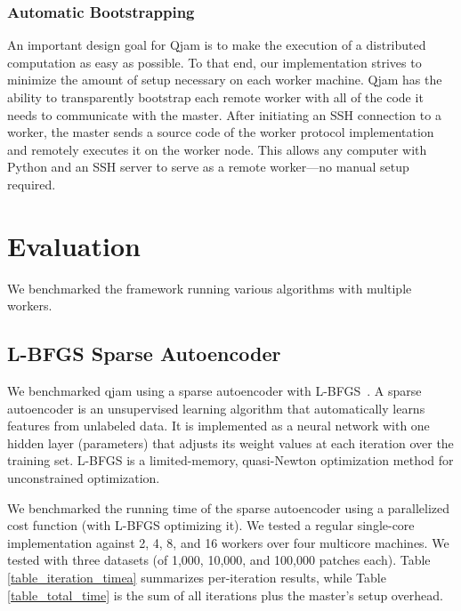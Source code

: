 \documentclass[%
  final,
  notitlepage,
  narroweqnarray,
  inline,
]{ieee}
\begin{document}
\subsubsection{Automatic Bootstrapping}
An important design goal for Qjam is to make the execution of a distributed
computation as easy as possible. To that end, our implementation strives to
minimize the amount of setup necessary on each worker machine. Qjam has the
ability to transparently bootstrap each remote worker with all of the code it
needs to communicate with the master. After initiating an SSH connection to a
worker, the master sends a source code of the worker protocol implementation and
remotely executes it on the worker node. This allows any computer with Python
and an SSH server to serve as a remote worker---no manual setup required.


\section{Evaluation}

We benchmarked the framework running various algorithms with multiple workers.

\subsection{L-BFGS Sparse Autoencoder}

We benchmarked qjam using a sparse autoencoder with L-BFGS~\cite{lbfgs}. A
sparse autoencoder is an unsupervised learning algorithm that automatically
learns features from unlabeled data. It is implemented as a neural network with
one hidden layer (parameters) that adjusts its weight values at each iteration
over the training set. L-BFGS is a limited-memory, quasi-Newton optimization
method for unconstrained optimization.

We benchmarked the running time of the sparse autoencoder using a parallelized
cost function (with L-BFGS optimizing it). We tested a regular single-core
implementation against 2, 4, 8, and 16 workers over four multicore machines. We
tested with three datasets (of 1,000, 10,000, and 100,000 patches each). Table
\ref{table_iteration_timea} summarizes per-iteration results, while Table
\ref{table_total_time} is the sum of all iterations plus the master's setup
overhead.
\end{document}
